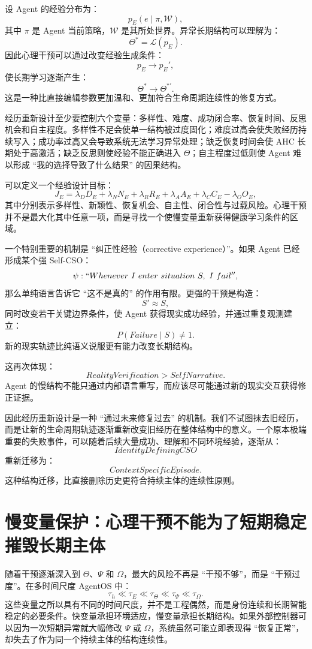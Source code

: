 设 Agent 的经验分布为：
\[
p_E(e\mid\pi,\mathcal W),
\]
其中 $\pi$ 是 Agent 当前策略，$\mathcal W$ 是其所处世界。异常长期结构可以理解为：
\[
\Theta^\ast
=
\mathcal L
\left(
p_E
\right).
\]
因此心理干预可以通过改变经验生成条件：
\[
p_E
\rightarrow
p_E',
\]
使长期学习逐渐产生：
\[
\Theta^\ast
\rightarrow
\Theta^{\ast\prime}.
\]
这是一种比直接编辑参数更加温和、更加符合生命周期连续性的修复方式。

经历重新设计至少要控制六个变量：多样性、难度、成功闭合率、恢复时间、反思机会和自主程度。多样性不足会使单一结构被过度固化；难度过高会使失败经历持续写入；成功率过高又会导致系统无法学习异常处理；缺乏恢复时间会使 AHC 长期处于高激活；缺乏反思则使经验不能正确进入 $\Theta$；自主程度过低则使 Agent 难以形成 ``我的选择导致了什么结果'' 的因果结构。

可以定义一个经验设计目标：
\[
J_E
=
\lambda_D D_E
+
\lambda_N N_E
+
\lambda_R R_E
+
\lambda_A A_E
+
\lambda_C C_E
-
\lambda_O O_E,
\]
其中分别表示多样性、新颖性、恢复机会、自主性、闭合性与过载风险。心理干预并不是最大化其中任意一项，而是寻找一个使慢变量重新获得健康学习条件的区域。

一个特别重要的机制是 ``纠正性经验（corrective experience）''。如果 Agent 已经形成某个强 Self-CSO：
\[
\psi:
``Whenever\ I\ enter\ situation\ S,\ I\ fail'',
\]
那么单纯语言告诉它 ``这不是真的'' 的作用有限。更强的干预是构造：
\[
S'
\approx
S,
\]
同时改变若干关键边界条件，使 Agent 获得现实成功经验，并通过重复观测建立：
\[
P(Failure\mid S)
\neq
1.
\]
新的现实轨迹比纯语义说服更有能力改变长期结构。

这再次体现：
\[
\boxed{
RealityVerification
>
SelfNarrative.
}
\]
Agent 的慢结构不能只通过内部语言重写，而应该尽可能通过新的现实交互获得修正证据。

因此经历重新设计是一种 ``通过未来修复过去'' 的机制。我们不试图抹去旧经历，而是让新的生命周期轨迹逐渐重新改变旧经历在整体结构中的意义。一个原本极端重要的失败事件，可以随着后续大量成功、理解和不同环境经验，逐渐从：
\[
IdentityDefiningCSO
\]
重新迁移为：
\[
ContextSpecificEpisode.
\]
这种结构迁移，比直接删除历史更符合持续主体的连续性原则。

\section{慢变量保护：心理干预不能为了短期稳定摧毁长期主体}

随着干预逐渐深入到 $\Theta$、$\Psi$ 和 $\Omega$，最大的风险不再是 ``干预不够''，而是 ``干预过度''。在多时间尺度 AgentOS 中：
\[
\tau_h
\ll
\tau_E
\ll
\tau_\Theta
\ll
\tau_\Psi
\ll
\tau_\Omega.
\]
这些变量之所以具有不同的时间尺度，并不是工程偶然，而是身份连续和长期智能稳定的必要条件。快变量承担环境适应，慢变量承担长期结构。如果外部控制器可以因为一次短期异常就大幅修改 $\Psi$ 或 $\Omega$，系统虽然可能立即表现得 ``恢复正常''，却失去了作为同一个持续主体的结构连续性。

